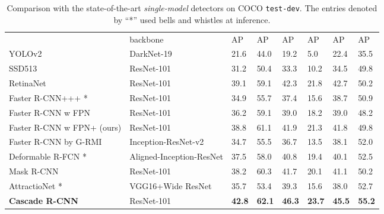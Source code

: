 \documentclass[10pt,twocolumn,letterpaper]{article}
\newcommand{\bd}[1]{\textbf{#1}}
\newcommand{\tablestyle}[2]{\setlength{\tabcolsep}{#1}\renewcommand{\arraystretch}{#2}\centering\footnotesize}
\begin{document}
\begin{table*}[t]
\tablestyle{3.5pt}{1.1}
\begin{tabular}{l|l|x{22}x{22}x{22}|x{22}x{22}x{22}}
&backbone &AP &AP &AP  &AP &AP &AP\\\shline
YOLOv2 \cite{DBLP:conf/cvpr/RedmonDGF16}       &DarkNet-19 &21.6 &44.0 &19.2  &5.0 &22.4 &35.5\\
SSD513 \cite{DBLP:conf/eccv/LiuAESRFB16}    &ResNet-101 &31.2 &50.4 &33.3  &10.2 &34.5 &49.8\\
RetinaNet \cite{lin2017focal} &ResNet-101  &39.1 &59.1 &42.3  &21.8 &42.7 &50.2\\\hline
Faster R-CNN+++ \cite{DBLP:conf/cvpr/HeZRS16}*      &ResNet-101 &34.9 &55.7 &37.4  &15.6 &38.7 &50.9\\
Faster R-CNN w FPN \cite{lin2017feature}   &ResNet-101 &36.2 &59.1 &39.0  &18.2 &39.0 &48.2\\
Faster R-CNN w FPN+ (ours) &ResNet-101 &38.8 &61.1 &41.9  &21.3 &41.8 &49.8\\
Faster R-CNN by G-RMI \cite{DBLP:journals/corr/HuangRSZKFFWSG016} &Inception-ResNet-v2 &34.7 &55.5 &36.7  &13.5 &38.1 &52.0\\
Deformable R-FCN \cite{dai2017deformable}*   &Aligned-Inception-ResNet &37.5 &58.0 &40.8  &19.4 &40.1 &52.5\\
Mask R-CNN \cite{he2017mask}       &ResNet-101 &38.2 &60.3 &41.7  &20.1 &41.1 &50.2\\\hline
AttractioNet \cite{DBLP:conf/bmvc/GidarisK16}* &VGG16+Wide ResNet &35.7 &53.4 &39.3  &15.6 &38.0 &52.7\\
\bd{Cascade R-CNN} &ResNet-101 &\bd{42.8} &\bd{62.1} &\bd{46.3}  &\bd{23.7} &\bd{45.5} &\bd{55.2}\\\hline
\end{tabular}
\vspace{0.1cm}
\caption{Comparison with the state-of-the-art \emph{single-model} detectors on COCO \texttt{test-dev}. The entries denoted by ``*'' used bells and whistles at inference.}
\label{tab:state-of-the-art}
\end{table*}
\end{document}
